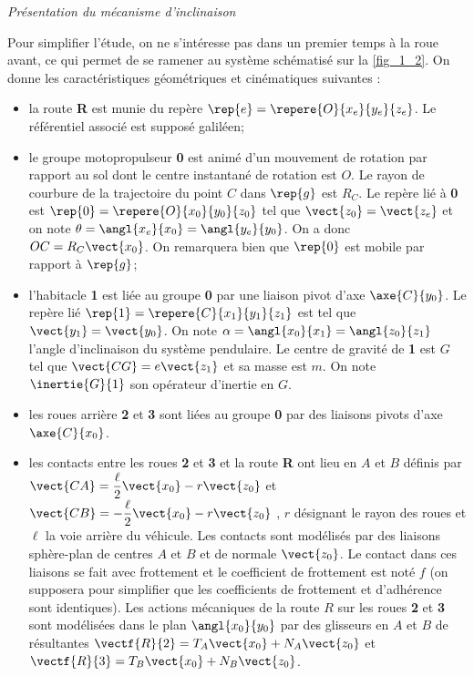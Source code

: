 \begin{multicols}{2}
\begin{center}
\textit{Présentation du mécanisme d'inclinaison}
\label{fig_1_1}
\end{center}


Pour simplifier l'étude, on ne s'intéresse pas dans un premier temps à la roue avant, ce qui permet de se ramener au système schématisé sur la \autoref{fig_1_2}. On donne les caractéristiques géométriques et cinématiques suivantes :
\begin{itemize}
\item la route \textbf{R} est munie du repère $\rep{e}=\repere{O}{x_e}{y_e}{z_e}$. Le référentiel associé est supposé galiléen;
\item le groupe motopropulseur \textbf{0} est animé d'un mouvement de rotation par rapport au sol dont le centre instantané de rotation est $O$. Le rayon de courbure de la trajectoire du point $C$ dans $\rep{g}$ est $R_C$. Le repère lié à \textbf{0} est $\rep{0}=\repere{O}{x_0}{y_0}{z_0}$ tel que $\vect{z_0}=\vect{z_e}$ et on note $\theta=\angl{x_e}{x_0}=\angl{y_e}{y_0}$. On a donc $OC=R_C\vect{x_0}$. On remarquera bien que $\rep{0}$ est mobile par rapport à $\rep{g}$;
\item l'habitacle \textbf{1} est liée au groupe \textbf{0} par une liaison pivot d'axe $\axe{C}{y_0}$. Le repère lié $\rep{1}=\repere{C}{x_1}{y_1}{z_1}$ est tel que $\vect{y_1}=\vect{y_0}$. On note $\alpha=\angl{x_0}{x_1}=\angl{z_0}{z_1}$ l'angle d'inclinaison du système pendulaire. Le centre de gravité de \textbf{1} est $G$ tel que $\vect{CG}=e\vect{z_1}$ et sa masse est $m$. On note $\inertie{G}{1}$ son opérateur d'inertie en $G$.
\item les roues arrière \textbf{2} et \textbf{3} sont liées au groupe \textbf{0} par des liaisons pivots d'axe $\axe{C}{x_0}$.
\item les contacts entre les roues \textbf{2} et \textbf{3} et la route \textbf{R} ont lieu en $A$ et $B$ définis par 
$\vect{CA}=\dfrac{\ell}{2}\vect{x_0}-r\vect{z_0}$ et $\vect{CB}=-\dfrac{\ell}{2}\vect{x_0}-r\vect{z_0}$ , $r$ désignant 
le rayon des roues et $\ell$ la voie arrière du véhicule. Les contacts sont modélisés par des liaisons sphère-plan de centres
 $A$ et $B$ et de normale $\vect{z_0}$. Le contact dans ces liaisons se fait avec frottement et le coefficient de frottement est
  noté $f$ (on supposera pour simplifier que les coefficients de frottement et d'adhérence sont identiques). Les actions
  mécaniques de la route $R$ sur les roues \textbf{2} et \textbf{3} sont modélisées dans le plan $\angl{x_0}{y_0}$  par des 
  glisseurs en $A$ et $B$ de résultantes 
  $\vectf{R}{2}=T_A\vect{x_0}+N_A\vect{z_0}$  et  $\vectf{R}{3}=T_B\vect{x_0}+N_B\vect{z_0}$.
\end{itemize}


\end{multicols}
